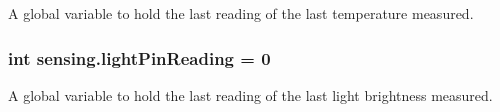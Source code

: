 A global variable to hold the last reading of the last temperature measured. 

\hypertarget{namespacesensing_a763e931b762ad2fa2b4cdb6f815ffe00}{
\subsubsection[{light\-Pin\-Reading}]{\setlength{\rightskip}{0pt plus 5cm}int sensing.\-light\-Pin\-Reading = 0}}\label{namespacesensing_a763e931b762ad2fa2b4cdb6f815ffe00}


A global variable to hold the last reading of the last light brightness measured. 

